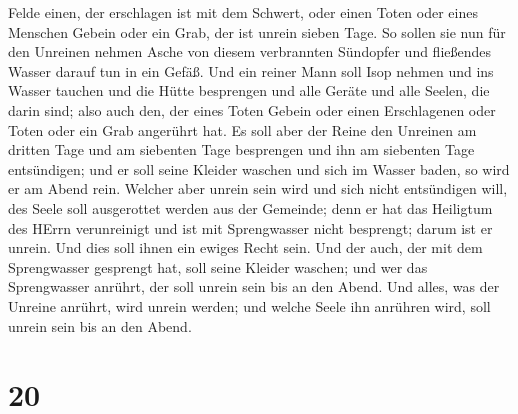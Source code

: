 Felde einen, der erschlagen ist mit dem Schwert, oder einen Toten oder
eines Menschen Gebein oder ein Grab, der ist unrein sieben Tage.
 So sollen sie nun für den Unreinen nehmen Asche von
diesem verbrannten Sündopfer und fließendes Wasser darauf tun in ein
Gefäß.  Und ein reiner Mann soll Isop nehmen und ins
Wasser tauchen und die Hütte besprengen und alle Geräte und alle Seelen,
die darin sind; also auch den, der eines Toten Gebein oder einen
Erschlagenen oder Toten oder ein Grab angerührt hat.  Es
soll aber der Reine den Unreinen am dritten Tage und am siebenten Tage
besprengen und ihn am siebenten Tage entsündigen; und er soll seine
Kleider waschen und sich im Wasser baden, so wird er am Abend rein.
 Welcher aber unrein sein wird und sich nicht entsündigen
will, des Seele soll ausgerottet werden aus der Gemeinde; denn er hat
das Heiligtum des HErrn verunreinigt und ist mit Sprengwasser nicht
besprengt; darum ist er unrein.  Und dies soll ihnen ein
ewiges Recht sein. Und der auch, der mit dem Sprengwasser gesprengt hat,
soll seine Kleider waschen; und wer das Sprengwasser anrührt, der soll
unrein sein bis an den Abend.  Und alles, was der Unreine
anrührt, wird unrein werden; und welche Seele ihn anrühren wird, soll
unrein sein bis an den Abend.

\hypertarget{section-19}{%
\section{20}\label{section-19}}

